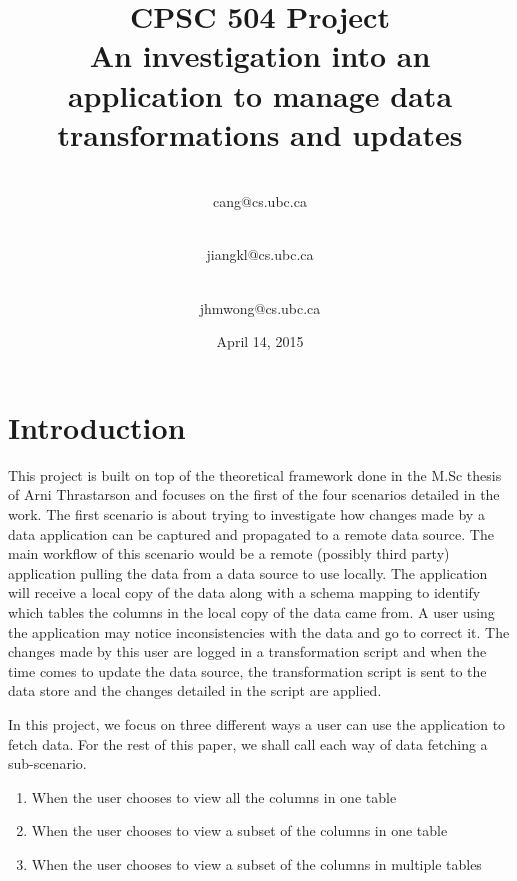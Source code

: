 \documentclass[12pt]{article}
\begin{document}
\begin{titlepage}
\title{\textbf{CPSC 504 Project\\\vspace{3 cm}\Huge{An investigation into an application to manage data transformations and updates}\vspace{2 cm}}}
\date{\vspace{2 cm} April 14, 2015}

\author{
 \\cang@cs.ubc.ca\\
  \and {}\\jiangkl@cs.ubc.ca\\
  \and {}\\jhmwong@cs.ubc.ca\\ 
}
\maketitle
\thispagestyle{empty}
\end{titlepage}

\newpage
\section{Introduction}
\label{sec:introduction}
This project is built on top of the theoretical framework done in the M.Sc thesis of Arni Thrastarson \cite{arniThesis} and focuses on the first of the four scenarios detailed in the work. The first scenario is about trying to investigate how changes made by a data application can be captured and propagated to a remote data source. The main workflow of this scenario would be a remote (possibly third party) application pulling the data from a data source to use locally. The application will receive a local copy of the data along with a schema mapping to identify which tables the columns in the local copy of the data came from. A user using the application may notice inconsistencies with the data and go to correct it. The changes made by this user are logged in a transformation script and when the time comes to update the data source, the transformation script is sent to the data store and the changes detailed in the script are applied.

In this project, we focus on three different ways a user can use the application to fetch data. For the rest of this paper, we shall call each way of data fetching a sub-scenario. 
\begin{enumerate}
	\item {When the user chooses to view all the columns in one table}
	\item {When the user chooses to view a subset of the columns in one table}
	\item {When the user chooses to view a subset of the columns in multiple tables}
\end{enumerate}
\end{document}
